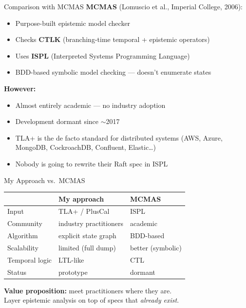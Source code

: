 \documentclass[aspectratio=169,12pt]{beamer}
\begin{document}

\begin{frame}{Comparison with MCMAS}
\textbf{MCMAS} (Lomuscio et al., Imperial College, 2006):
\begin{itemize}
\item Purpose-built epistemic model checker
\item Checks \textbf{CTLK} (branching-time temporal + epistemic operators)
\item Uses \textbf{ISPL} (Interpreted Systems Programming Language)
\item BDD-based symbolic model checking --- doesn't enumerate states
\end{itemize}

\vspace{0.3em}
\textbf{However:}
\begin{itemize}
\item Almost entirely academic --- no industry adoption
\item Development dormant since $\sim$2017
\item TLA+ is the de facto standard for distributed systems
{\small (AWS, Azure, MongoDB, CockroachDB, Confluent, Elastic\ldots)}
\item Nobody is going to rewrite their Raft spec in ISPL
\end{itemize}
\end{frame}

\begin{frame}{My Approach vs.\ MCMAS}
\begin{center}
\renewcommand{\arraystretch}{1.4}
\begin{tabular}{l|l|l}
& \textbf{My approach} & \textbf{MCMAS} \\
\hline
Input & TLA+ / PlusCal & ISPL \\
Community & industry practitioners & academic \\
Algorithm & explicit state graph & BDD-based \\
Scalability & limited (full dump) & better (symbolic) \\
Temporal logic & LTL-like & CTL \\
Status & prototype & dormant \\
\end{tabular}
\end{center}

\vspace{0.5em}
\textbf{Value proposition:} meet practitioners where they are.\\
Layer epistemic analysis on top of specs that \emph{already exist}.
\end{frame}
\end{document}
